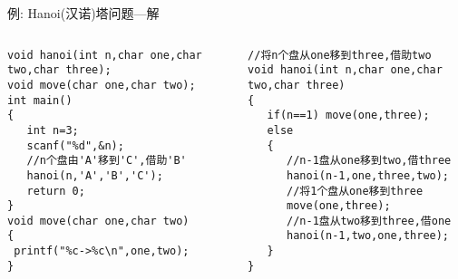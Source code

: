 \begin{frame}{例: Hanoi(汉诺)塔问题---解}
\begin{columns}[T]
\begin{lstlisting}
void hanoi(int n,char one,char two,char three);
void move(char one,char two);
int main()
{
   int n=3;
   scanf("%d",&n);
   //n个盘由'A'移到'C',借助'B'
   hanoi(n,'A','B','C');
   return 0;
}
void move(char one,char two)
{
 printf("%c->%c\n",one,two);
}
\end{lstlisting}
\begin{lstlisting}[frame=leftline]
//将n个盘从one移到three,借助two
void hanoi(int n,char one,char two,char three)
{
   if(n==1) move(one,three); 
   else
   {
      //n-1盘从one移到two,借three
      hanoi(n-1,one,three,two); 
      //将1个盘从one移到three
      move(one,three); 
      //n-1盘从two移到three,借one
      hanoi(n-1,two,one,three); 
   }
}
\end{lstlisting}
\end{columns}
~\\
\end{frame}

